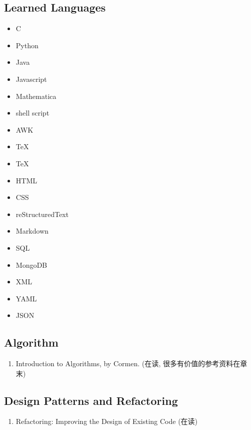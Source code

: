 \documentclass{article}
\begin{document}
\subsection{Learned Languages}
\begin{itemize}
    \item C
    \item Python
    \item Java
    \item Javascript
    \item Mathematica
    \item shell script
    \item AWK
    \item TeX
    \item TeX
    \item HTML
    \item CSS
    \item reStructuredText
    \item Markdown
    \item SQL
    \item MongoDB
    \item XML
    \item YAML
    \item JSON
\end{itemize}
%
\subsection{Algorithm}
\begin{enumerate}
    \item Introduction to Algorithms, by Cormen. (在读, 很多有价值的参考资料在章末)
\end{enumerate}
\subsection{Design Patterns and Refactoring}
\begin{enumerate}
    \item Refactoring: Improving the Design of Existing Code (在读)
\end{enumerate}
\end{document}
